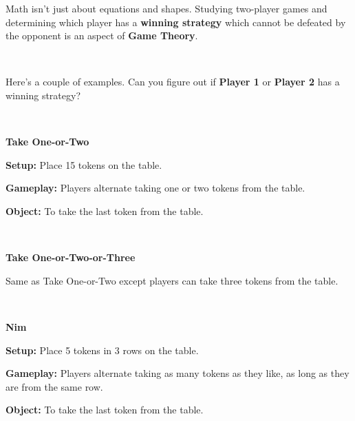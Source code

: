 

\newcommand{\activityname}{
  Secret of Nim
}
\newcommand{\subtitle}{
  It's all fun and Game Theory
}



Math isn't just about equations and shapes. Studying two-player games and determining which player has a \textbf{winning strategy} which cannot be defeated by the opponent is an aspect of \textbf{Game Theory}.

\

Here's a couple of examples. Can you figure out if \textbf{Player 1} or \textbf{Player 2} has a winning strategy?

\

\noindent\textbf{\Huge Take One-or-Two}

\textbf{Setup:} Place 15 tokens on the table.

\textbf{Gameplay:} Players alternate taking one or two tokens from the table.

\textbf{Object:} To take the last token from the table.

\

\noindent\textbf{\Huge Take One-or-Two-or-Three}

Same as Take One-or-Two except players can take three tokens from the table.

\

\noindent\textbf{\Huge Nim}

\textbf{Setup:} Place 5 tokens in 3 rows on the table.

\textbf{Gameplay:} Players alternate taking as many tokens as they like, as long as they are from the same row.

\textbf{Object:} To take the last token from the table.

